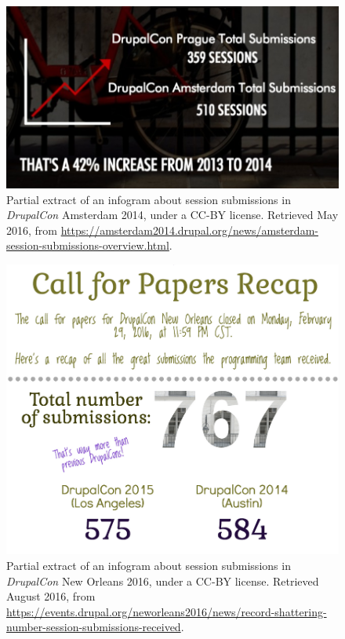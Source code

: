 \begin{figure}[H]
\centering
\includegraphics[scale=0.3]{img/offline/cfp_dcon_amsterdam.png}
\caption[Partial extract of an infogram about session submissions in \textit{DrupalCon} Amsterdam 2014]%
{Partial extract of an infogram about session submissions in \textit{DrupalCon} Amsterdam 2014, under a CC-BY license. Retrieved  May 2016, from \url{https://amsterdam2014.drupal.org/news/amsterdam-session-submissions-overview.html}.}
\label{dcons_eu_infogram}
\end{figure}

\begin{figure}[H]
\centering
\includegraphics[scale=0.3]{img/offline/cfp_dcon_neworleans.png}
\caption[Partial extract of an infogram about session submissions in \textit{DrupalCon} New Orleans 2016]%
{Partial extract of an infogram about session submissions in \textit{DrupalCon} New Orleans 2016, under a CC-BY license. Retrieved  August 2016, from \url{https://events.drupal.org/neworleans2016/news/record-shattering-number-session-submissions-received}. }
\label{dcons_us_infogram}
\end{figure}

